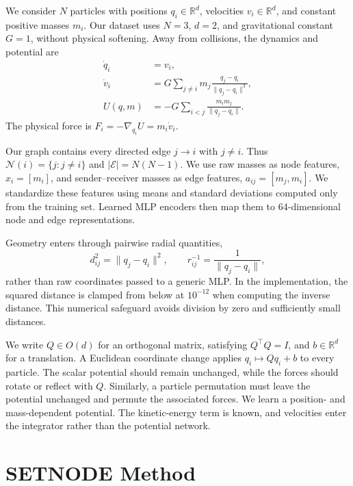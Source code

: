 \documentclass[10pt,letterpaper,twocolumn]{article}
\newcommand{\R}{\mathbb R}
\newcommand{\cN}{\mathcal N}
\newcommand{\norm}[1]{\lVert #1\rVert}
\numberwithin{equation}{section}
\begin{document}
We consider $N$ particles with positions $q_i\in\R^d$, velocities $v_i\in\R^d$, and constant positive
masses $m_i$. Our dataset uses $N=3$, $d=2$, and gravitational constant $G=1$, without physical
softening. Away from collisions, the dynamics and potential are
\begin{equation}
\begin{aligned}
\dot q_i &= v_i,\\
\dot v_i &= G\sum_{j\ne i}m_j\frac{q_j-q_i}{\norm{q_j-q_i}^{3}},\\
U(q,m) &= -G\sum_{i<j}\frac{m_im_j}{\norm{q_j-q_i}}.
\end{aligned}
\label{eq:physical}
\end{equation}
The physical force is $F_i=-\nabla_{q_i}U=m_i\dot v_i$.

Our graph contains every directed edge $j\to i$ with $j\ne i$. Thus
$\cN(i)=\{j:j\ne i\}$ and $|\mathcal E|=N(N-1)$. We use raw masses as node features,
$x_i=[m_i]$, and sender--receiver masses as edge features, $a_{ij}=[m_j,m_i]$.
We standardize these features using means and standard deviations computed only from the training
set. Learned MLP encoders then map them to 64-dimensional node and edge representations.

Geometry enters through pairwise radial quantities,
\begin{equation}
d_{ij}^2=\norm{q_j-q_i}^2,\qquad
r_{ij}^{-1}=\frac{1}{\norm{q_j-q_i}},
\label{eq:radial}
\end{equation}
rather than raw coordinates passed to a generic MLP. In the implementation, the squared distance is
clamped from below at $10^{-12}$ when computing the inverse distance. This numerical safeguard
avoids division by zero and sufficiently small distances.

We write $Q\in O(d)$ for an orthogonal matrix, satisfying $Q^\top Q=I$, and $b\in\R^d$ for a
translation. A Euclidean coordinate change applies $q_i\mapsto Qq_i+b$ to every particle. The
scalar potential should remain unchanged, while the forces should rotate or reflect with $Q$.
Similarly, a particle permutation must leave the potential unchanged and permute the associated
forces. We learn a position- and mass-dependent potential. The kinetic-energy term is known,
and velocities enter the integrator rather than the potential network.

\section{SETNODE Method}
\label{sec:method}
\end{document}
